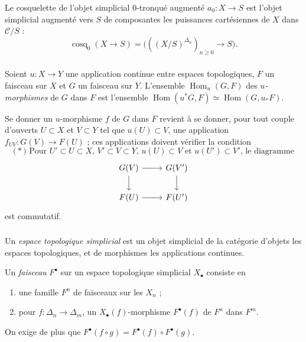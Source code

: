 \documentclass[11pt]{amsart}
\theoremstyle{plain}
\theoremstyle{definition}
\DeclareMathOperator{\Hom}{Hom}
\DeclareMathOperator{\cosq}{cosq}
\newcommand{\cC}{\mathcal{C}}
\begin{document}
\subsubsection{}
Le cosquelette de l'objet simplicial $0$-tronqu\'e augment\'e $a_0 : X \to S$ est
l'objet simplicial augment\'e vers $S$ de composantes les puissances cart\'esiennes de $X$
dans $\cC/S$ :
\[
\cosq_0(X \to S) = \big(((X/S)^{\Delta_n})_{n \geq 0} \to S\big).
\]

\subsubsection{}
Soient $u : X \to Y$ une application continue entre espaces topologiques,
$F$ un faisceau sur $X$ et $G$ un faisceau sur $Y$. L'ensemble $\Hom_u(G, F)$ des \emph{$u$-morphismes}
de $G$ dans $F$ est l'ensemble $\Hom(u^*G, F) \simeq \Hom(G, u_*F)$.

Se donner un $u$-morphisme $f$ de $G$ dans $F$ revient \`a se donner, pour tout couple
d'ouverts $U \subset X$ et $V \subset Y$ tel que $u(U) \subset V$, une application $f_{UV} : G(V) \to F(U)$ ;
ces applications doivent v\'erifier la condition
\begin{equation*}
\text{($*$) Pour $U' \subset U \subset X$, $V' \subset V \subset Y$, $u(U) \subset V$ et $u(U') \subset V'$, le diagramme}
\end{equation*}
\[
\begin{tikzcd}
G(V) \arrow[r] \arrow[d] & G(V') \arrow[d] \\
F(U) \arrow[r] & F(U')
\end{tikzcd}
\]
est commutatif.

\subsubsection{}
Un \emph{espace topologique simplicial} est un objet simplicial de la cat\'egorie d'objets
les espaces topologiques, et de morphismes les applications continues.

Un \emph{faisceau} $F^\bullet$ sur un espace topologique simplicial $X_\bullet$ consiste en
\begin{enumerate}
\item[(a)] une famille $F^n$ de faisceaux sur les $X_n$ ;
\item[(b)] pour $f : \Delta_n \to \Delta_m$, un $X_\bullet(f)$-morphisme $F^\bullet(f)$ de $F^n$ dans $F^m$.
\end{enumerate}
On exige de plus que $F^\bullet(f \circ g) = F^\bullet(f) \circ F^\bullet(g)$.
\end{document}
